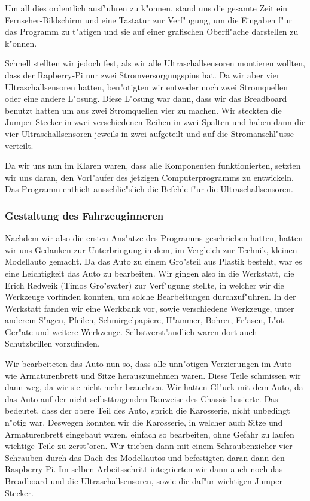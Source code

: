 \documentclass[a4paper,12pt]{article}
\begin{document}
Um all dies ordentlich ausf"uhren zu k"onnen, stand uns die gesamte Zeit ein Fernseher-Bildschirm und eine Tastatur zur Verf"ugung, um die Eingaben f"ur das Programm zu t"atigen und sie auf einer grafischen Oberfl"ache darstellen zu k"onnen.

Schnell stellten wir jedoch fest, als wir alle Ultraschallsensoren montieren wollten, dass der Rapberry-Pi nur zwei Stromversorgungspins hat.
Da wir aber vier Ultraschallsensoren hatten, ben"otigten wir entweder noch zwei Stromquellen oder eine andere L"osung.
Diese L"osung war dann, dass wir das Breadboard benutzt hatten um aus zwei Stromquellen vier zu machen.
Wir steckten die Jumper-Stecker in zwei verschiedenen Reihen in zwei Spalten und haben dann die vier Ultraschallsensoren jeweils in zwei aufgeteilt und auf die Stromanschl"usse verteilt.

Da wir uns nun im Klaren waren, dass alle Komponenten funktionierten, setzten wir uns daran, den Vorl"aufer des jetzigen Computerprogramms zu entwickeln.
Das Programm enthielt ausschlie"slich die Befehle f"ur die Ultraschallsensoren.

\subsubsection{Gestaltung des Fahrzeuginneren}\label{sec2.1.3}

Nachdem wir also die ersten Ans"atze des Programms geschrieben hatten, hatten wir uns Gedanken zur Unterbringung in dem, im Vergleich zur Technik, kleinen Modellauto gemacht.
Da das Auto zu einem Gro"steil aus Plastik besteht, war es eine Leichtigkeit das Auto zu bearbeiten.
Wir gingen also in die Werkstatt, die Erich Redweik (Timos Gro"svater) zur Verf"ugung stellte, in welcher wir die Werkzeuge vorfinden konnten, um solche Bearbeitungen durchzuf"uhren.
In der Werkstatt fanden wir eine Werkbank vor, sowie verschiedene Werkzeuge, unter anderem S"agen, Pfeilen, Schmirgelpapiere, H"ammer, Bohrer, Fr"asen, L"ot-Ger"ate und weitere Werkzeuge. Selbstverst"andlich waren dort auch Schutzbrillen vorzufinden.

Wir bearbeiteten das Auto nun so, dass alle unn"otigen Verzierungen im Auto wie Armaturenbrett und Sitze herauszunehmen waren.
Diese Teile schmissen wir dann weg, da wir sie nicht mehr brauchten.
Wir hatten Gl"uck mit dem Auto, da das Auto auf der nicht selbsttragenden Bauweise des Chassis basierte.
Das bedeutet, dass der obere Teil des Auto, sprich die Karosserie, nicht unbedingt n"otig war.
Deswegen konnten wir die Karosserie, in welcher auch Sitze und  Armaturenbrett eingebaut waren, einfach so bearbeiten, ohne Gefahr zu laufen wichtige Teile zu zerst"oren.
Wir trieben dann mit einem Schraubenzieher vier Schrauben durch das Dach des Modellautos und befestigten daran dann den Raspberry-Pi.
Im selben Arbeitsschritt integrierten wir dann auch noch das Breadboard und die Ultraschallsensoren, sowie die daf"ur wichtigen Jumper-Stecker.
\end{document}
